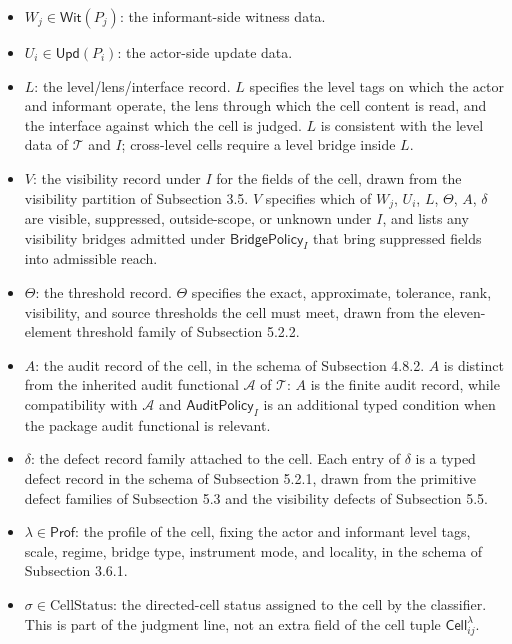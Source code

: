 \documentclass[11pt]{article}
\providecommand{\tightlist}{}
\theoremstyle{definition}
\begin{document}
\begin{itemize}
\tightlist
\item
  \(W_j\in\mathsf{Wit}(P_j)\): the informant-side witness data.
\item
  \(U_i\in\mathsf{Upd}(P_i)\): the actor-side update data.
\item
  \(L\): the level/lens/interface record. \(L\) specifies the level tags on which the actor and informant operate, the lens through which the cell content is read, and the interface against which the cell is judged. \(L\) is consistent with the level data of \(\mathcal T\) and \(I\); cross-level cells require a level bridge inside \(L\).
\item
  \(V\): the visibility record under \(I\) for the fields of the cell, drawn from the visibility partition of Subsection 3.5. \(V\) specifies which of \(W_j\), \(U_i\), \(L\), \(\Theta\), \(A\), \(\delta\) are visible, suppressed, outside-scope, or unknown under \(I\), and lists any visibility bridges admitted under \(\mathsf{BridgePolicy}_I\) that bring suppressed fields into admissible reach.
\item
  \(\Theta\): the threshold record. \(\Theta\) specifies the exact, approximate, tolerance, rank, visibility, and source thresholds the cell must meet, drawn from the eleven-element threshold family of Subsection 5.2.2.
\item
  \(A\): the audit record of the cell, in the schema of Subsection 4.8.2. \(A\) is distinct from the inherited audit functional \(\mathcal A\) of \(\mathcal T\): \(A\) is the finite audit record, while compatibility with \(\mathcal A\) and \(\mathsf{AuditPolicy}_I\) is an additional typed condition when the package audit functional is relevant.
\item
  \(\delta\): the defect record family attached to the cell. Each entry of \(\delta\) is a typed defect record in the schema of Subsection 5.2.1, drawn from the primitive defect families of Subsection 5.3 and the visibility defects of Subsection 5.5.
\item
  \(\lambda\in\mathsf{Prof}\): the profile of the cell, fixing the actor and informant level tags, scale, regime, bridge type, instrument mode, and locality, in the schema of Subsection 3.6.1.
\item
  \(\sigma\in\mathrm{CellStatus}\): the directed-cell status assigned to the cell by the classifier. This is part of the judgment line, not an extra field of the cell tuple \(\mathsf{Cell}_{ij}^{\lambda}\).
\end{itemize}
\end{document}
